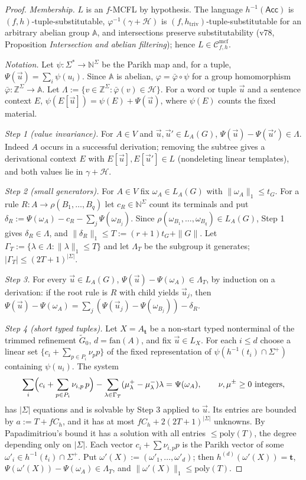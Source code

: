\documentclass[11pt]{article}
\theoremstyle{definition}
\theoremstyle{remark}
\newcommand{\Cmcf}[2]{\mathcal{C}^{\mathrm{mcf}}_{#1,#2}}
\newcommand{\tuple}[1]{\vec{#1}}
\newcommand{\Z}{\mathbb Z}
\newcommand{\N}{\mathbb N}
\begin{document}
\begin{proof}
\emph{Membership.}  $L$ is an $f$-MCFL by hypothesis.  The language
$h^{-1}(\mathsf{Acc})$ is $(f,h)$-tuple-substitutable,
$\varphi^{-1}(\gamma+\mathcal H)$ is $(f,h_{\mathrm{triv}})$-tuple-substitutable
for an arbitrary abelian group $\mathbb A$, and intersections preserve
substitutability (v78, Proposition \emph{Intersection and abelian
filtering}); hence $L\in\Cmcf{f}{h}$.

\emph{Notation.}  Let $\psi:\Sigma^*\to\N^\Sigma$ be the Parikh map and,
for a tuple, $\Psi(\tuple u)=\sum_i\psi(u_i)$.  Since $\mathbb A$ is
abelian, $\varphi=\bar\varphi\circ\psi$ for a group homomorphism
$\bar\varphi:\Z^\Sigma\to\mathbb A$.  Let
$\Lambda:=\{v\in\Z^\Sigma:\bar\varphi(v)\in\mathcal H\}$.  For a word or
tuple $\tuple u$ and a sentence context $E$, $\psi(E[\tuple u])=\psi(E)+
\Psi(\tuple u)$, where $\psi(E)$ counts the fixed material.

\emph{Step 1 (value invariance).}  For $A\in V$ and
$\tuple u,\tuple u'\in L_A(G)$, $\Psi(\tuple u)-\Psi(\tuple u')\in\Lambda$.
Indeed $A$ occurs in a successful derivation; removing the subtree gives a
derivational context $E$ with $E[\tuple u],E[\tuple u']\in L$
(nondeleting linear templates), and both values lie in $\gamma+\mathcal H$.

\emph{Step 2 (small generators).}  For $A\in V$ fix
$\omega_A\in L_A(G)$ with $\|\omega_A\|_1\le t_G$.  For a rule
$R:A\to\rho(B_1,\ldots,B_q)$ let $c_R\in\N^\Sigma$ count its terminals and
put $\delta_R:=\Psi(\omega_A)-c_R-\sum_j\Psi(\omega_{B_j})$.  Since
$\rho(\omega_{B_1},\ldots,\omega_{B_q})\in L_A(G)$, Step 1 gives
$\delta_R\in\Lambda$, and $\|\delta_R\|_1\le T:=(r+1)t_G+\|G\|$.  Let
$\Gamma_T:=\{\lambda\in\Lambda:\|\lambda\|_1\le T\}$ and let
$\Lambda_T$ be the subgroup it generates; $|\Gamma_T|\le(2T+1)^{|\Sigma|}$.

\emph{Step 3.}  For every $\tuple u\in L_A(G)$,
$\Psi(\tuple u)-\Psi(\omega_A)\in\Lambda_T$, by induction on a derivation:
if the root rule is $R$ with child yields $\tuple u_j$, then
$\Psi(\tuple u)-\Psi(\omega_A)=\sum_j(\Psi(\tuple u_j)-\Psi(\omega_{B_j}))
-\delta_R$.

\emph{Step 4 (short typed tuples).}  Let $X=A_{\mathbf t}$ be a non-start
typed nonterminal of the trimmed refinement $\widetilde G_0$,
$d=\mathrm{fan}(A)$, and fix $\tuple u\in L_X$.  For each $i\le d$ choose a
linear set $\{c_i+\sum_{p\in P_i}\nu_pp\}$ of the fixed representation of
$\psi(h^{-1}(t_i)\cap\Sigma^+)$ containing $\psi(u_i)$.  The system
\[
 \sum_{i}\Bigl(c_i+\sum_{p\in P_i}\nu_{i,p}\,p\Bigr)
 -\sum_{\lambda\in\Gamma_T}(\mu^+_\lambda-\mu^-_\lambda)\lambda
 =\Psi(\omega_A),
 \qquad \nu,\mu^\pm\ge0\text{ integers},
\]
has $|\Sigma|$ equations and is solvable by Step 3 applied to $\tuple u$.
Its entries are bounded by $a:=T+fC_h$, and it has at most
$fC_h+2(2T+1)^{|\Sigma|}$ unknowns.  By Papadimitriou's bound it has a
solution with all entries $\le\mathrm{poly}(T)$, the degree depending only
on $|\Sigma|$.  Each vector $c_i+\sum\nu_{i,p}p$ is the Parikh vector of
some $\omega'_i\in h^{-1}(t_i)\cap\Sigma^+$.  Put
$\omega'(X):=(\omega'_1,\ldots,\omega'_d)$; then
$h^{(d)}(\omega'(X))=\mathbf t$, $\Psi(\omega'(X))-\Psi(\omega_A)\in
\Lambda_T$, and $\|\omega'(X)\|_1\le\mathrm{poly}(T)$.


\end{proof}
\end{document}

